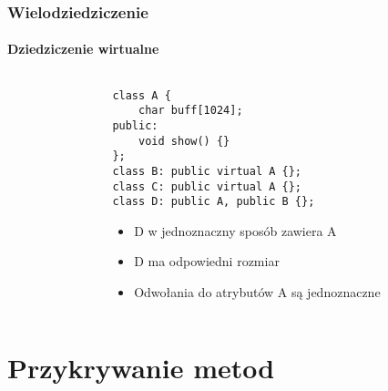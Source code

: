 \documentclass[10pt]{beamer}
\begin{document}
\begin{frame}[fragile]
  \frametitle{Wielodziedziczenie}
  \framesubtitle{Dziedziczenie wirtualne}
  \begin{columns}
    \begin{column}{0.49\textwidth}
    \end{column}
    \begin{column}{0.49\textwidth}
    \begin{lstlisting}
class A {
    char buff[1024];
public:
    void show() {}
};
class B: public virtual A {};
class C: public virtual A {};
class D: public A, public B {};
\end{lstlisting}
    \begin{itemize}
      \item D w jednoznaczny sposób zawiera A
      \item D ma odpowiedni rozmiar
      \item Odwołania do atrybutów A są jednoznaczne
    \end{itemize}
    \end{column}
  \end{columns}
\end{frame}

\section{Przykrywanie metod}
\end{document}
